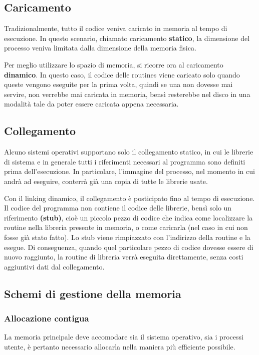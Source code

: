 \documentclass[a4]{article}
\begin{document}
\subsection{Caricamento}
Tradizionalmente, tutto il codice veniva caricato in memoria al tempo di esecuzione. In questo scenario, chiamato caricamento \textbf{statico}, la dimensione del processo veniva limitata dalla dimensione della memoria fisica.

Per meglio utilizzare lo spazio di memoria, si ricorre ora al caricamento \textbf{dinamico}. In questo caso, il codice delle routines viene caricato solo quando queste vengono eseguite per la prima volta, quindi se una non dovesse mai servire, non verrebbe mai caricata in memoria, bensì resterebbe nel disco in una modalità tale da poter essere caricata appena necessaria.

\subsection{Collegamento}
Alcuno sistemi operativi supportano solo il collegamento statico, in cui le librerie di sistema e in generale tutti i riferimenti necessari al programma sono definiti prima dell'esecuzione. In particolare, l'immagine del processo, nel momento in cui andrà ad eseguire, conterrà già una copia di tutte le librerie usate.

Con il linking dinamico, il collegamento è posticipato fino al tempo di esecuzione. Il codice del programma non contiene il codice delle librerie, bensì solo un riferimento \textbf{(stub)}, cioè un piccolo pezzo di codice che indica come localizzare la routine nella libreria presente in memoria, o come caricarla (nel caso in cui non fosse già stato fatto). Lo stub viene rimpiazzato con l'indirizzo della routine e la esegue. Di conseguenza, quando quel particolare pezzo di codice dovesse essere di nuovo raggiunto, la routine di libreria verrà eseguita direttamente, senza costi aggiuntivi dati dal collegamento.

\subsection{Schemi di gestione della memoria}

\subsubsection{Allocazione contigua}
La memoria principale deve accomodare sia il sistema operativo, sia i processi utente, è pertanto necessario allocarla nella maniera più efficiente possibile.
\end{document}
